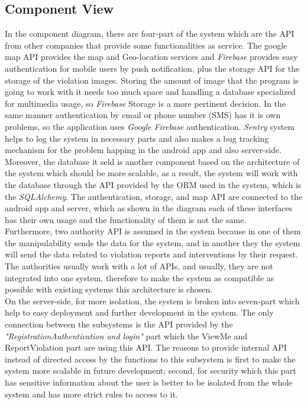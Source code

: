 \subsection{Component View}
In the component diagram, there are four-part of the system which are the API from other companies that provide some functionalities as service. The google map API provides the map and Geo-location services and  \emph{Firebase} provides easy authentication for mobile users by push notification, plus the storage API for the storage of the violation images. Storing the amount of image that the program is going to work with it needs too much space and handling a database specialized for multimedia usage, so  \emph{Firebase} Storage is a more pertinent decision. In the same manner authentication by email or phone number (SMS) has it is own problems, so the application uses  \emph{Google Firebase} authentication. \emph{Sentry} system helps to log the system in necessary parts and also makes a bug tracking mechanism for the problem happing in the android app and also server-side. Moreover, the database it seld is another component based on the architecture of the system which should be more scalable, as a result, the system will work with the database through the API provided by the ORM used in the system, which is the  \emph{SQLAlchemy}. The authentication, storage, and map API are connected to the android app and server, which as shown in the diagram each of these interfaces has their own usage and the functionality of them is not the same. \\
Furthermore, two authority API is assumed in the system because in one of them the manipulability sends the data for the system, and in another they the system will send the data related to violation reports and interventions by their request. The authorities usually work with a lot of APIs, and usually, they are not integrated into one system, therefore to make the system as compatible as possible with existing systems this architecture is chosen.\\
 On the server-side, for more isolation, the system is broken into seven-part which help to easy deployment and further development in the system. The only connection between the subsystems is the API provided by the  \emph{"Registration\/Authentication and login"} part which the ViewMe and ReportViolation part are using this API. The reasons to provide internal API instead of directed access by the functions to this subsystem is first to make the system more scalable in future development; second, for security which this part has sensitive information about the user is better to be isolated from the whole system and has more strict rules to access to it.\\
